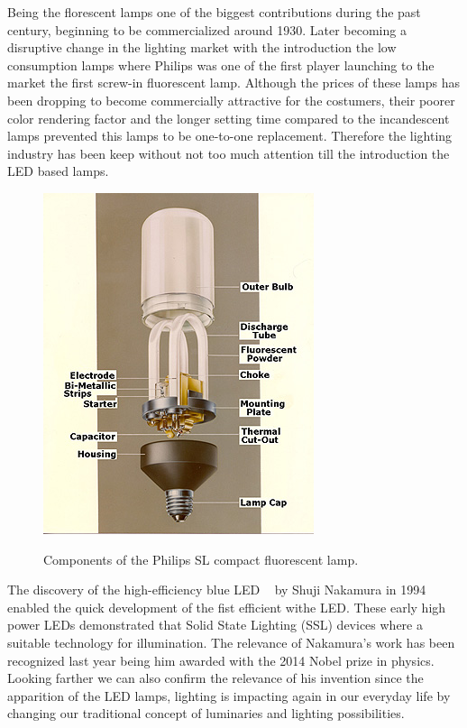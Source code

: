 Being the florescent lamps one of the biggest contributions during the past century, beginning  to be commercialized around 1930. Later becoming a disruptive change in the lighting market with the introduction the low consumption lamps where Philips was one of the first player launching to the market the first screw-in fluorescent lamp. Although the prices of these lamps has been dropping to become commercially attractive for the costumers, their poorer color rendering factor and the longer setting time compared to the incandescent lamps prevented this lamps to be one-to-one replacement. Therefore the lighting industry has been keep without not too much attention till the introduction the LED based lamps. 



\vspace{5mm} %

\begin{figure}[!h]
\centering
\includegraphics{./0_intro/img/phil1b.jpg}
\label{fig:philips_sl}
\caption{Components of the Philips SL compact fluorescent lamp. }
\end{figure}

The discovery of the high-efficiency blue LED ~\cite{94Nakamura} by Shuji Nakamura in 1994 enabled the quick development of the fist efficient withe LED. These early high power LEDs demonstrated that Solid State Lighting (SSL) devices  where a suitable technology for illumination. The relevance of Nakamura's work has been recognized last year being him awarded with the 2014 Nobel prize in physics. Looking farther we can also confirm the relevance of his invention since the apparition of the LED lamps, lighting is impacting again in our everyday life by changing our traditional concept of luminaries and lighting possibilities.

